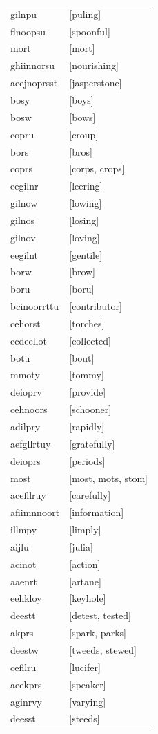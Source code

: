 \documentclass{article}
\begin{document}
\begin{tabular}{ll}
gilnpu & [puling] \\
flnoopsu & [spoonful] \\
mort & [mort] \\
ghiinnorsu & [nourishing] \\
aeejnoprsst & [jasperstone] \\
bosy & [boys] \\
bosw & [bows] \\
copru & [croup] \\
bors & [bros] \\
coprs & [corps, crops] \\
eegilnr & [leering] \\
gilnow & [lowing] \\
gilnos & [losing] \\
gilnov & [loving] \\
eegilnt & [gentile] \\
borw & [brow] \\
boru & [boru] \\
bcinoorrttu & [contributor] \\
cehorst & [torches] \\
ccdeellot & [collected] \\
botu & [bout] \\
mmoty & [tommy] \\
deioprv & [provide] \\
cehnoors & [schooner] \\
adilpry & [rapidly] \\
aefgllrtuy & [gratefully] \\
deioprs & [periods] \\
most & [most, mots, stom] \\
acefllruy & [carefully] \\
afiimnnoort & [information] \\
illmpy & [limply] \\
aijlu & [julia] \\
acinot & [action] \\
aaenrt & [artane] \\
eehkloy & [keyhole] \\
deestt & [detest, tested] \\
akprs & [spark, parks] \\
deestw & [tweeds, stewed] \\
cefilru & [lucifer] \\
aeekprs & [speaker] \\
aginrvy & [varying] \\
deesst & [steeds] \\

\end{tabular}
\end{document}
